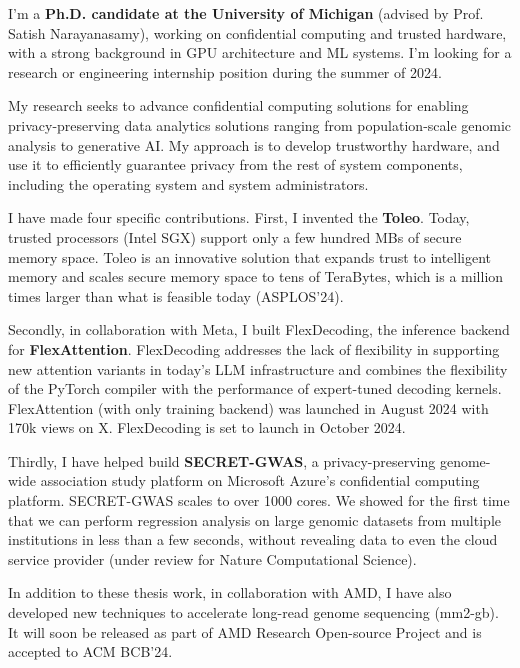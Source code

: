 I'm a \textbf{Ph.D. candidate at the University of Michigan} (advised by Prof. Satish Narayanasamy), working on confidential computing and trusted hardware, with a strong background in GPU architecture and ML systems. I'm looking for a research or engineering internship position during the summer of 2024. \par
My research seeks to advance confidential computing solutions for enabling privacy-preserving data analytics solutions ranging from population-scale genomic analysis to generative AI. My approach is to develop trustworthy hardware, and use it to efficiently guarantee privacy from the rest of system components, including the operating system and system administrators. \par

\vspace{3ex}

I have made four specific contributions. First, I invented the \textbf{Toleo}. Today, trusted processors (Intel SGX) support only a few hundred MBs of secure memory space. Toleo is an innovative solution that expands trust to intelligent memory and scales secure memory space to tens of TeraBytes, which is a million times larger than what is feasible today (ASPLOS'24).\par


Secondly, in collaboration with Meta, I built FlexDecoding, the inference backend for \textbf{FlexAttention}. FlexDecoding addresses the lack of flexibility in supporting new attention variants in today's LLM infrastructure and combines the flexibility of the PyTorch compiler with the performance of expert-tuned decoding kernels. FlexAttention (with only training backend) was launched in August 2024 with 170k views on X. FlexDecoding is set to launch in October 2024.\par


Thirdly, I have helped build \textbf{SECRET-GWAS}, a privacy-preserving genome-wide association study platform on Microsoft Azure's confidential computing platform.  SECRET-GWAS scales to over 1000 cores. We showed for the first time that we can perform regression analysis on large genomic datasets from multiple institutions in less than a few seconds, without revealing data to even the cloud service provider (under review for Nature Computational Science).\par

In addition to these thesis work, in collaboration with AMD, I have also developed new techniques to accelerate long-read genome sequencing (mm2-gb). It will soon be released as part of AMD Research Open-source Project and is accepted to ACM BCB'24. \par


